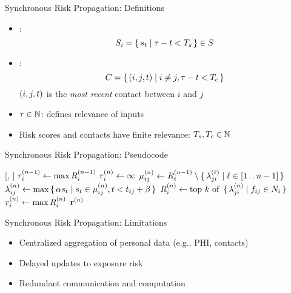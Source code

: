 \documentclass[11pt]{beamer}
\begin{document}
\begin{frame}{Synchronous Risk Propagation: Definitions}
\begin{itemize}
  \item {}:
    \begin{equation*}
      S_i =\set{ s_t | \tau- t< T_s} \in S
    \end{equation*}
    \item {}:
      \begin{equation*}
        C = \set{ (i, j, t) | i \neq j, \tau- t< T_c}
      \end{equation*}
      $(i, j, t)$ is the \emph{most recent} contact between $i$ and $j$
      \item {} $\tau \in \mathbb{N}$: defines relevance of inputs
      \item Risk scores and contacts have finite relevance: $T_s, T_c \in \mathbb{N}$
\end{itemize}
\end{frame}

\begin{frame}{Synchronous Risk Propagation: Pseudocode}
\begin{function}{\nRiskPropagation}[\vScores, \vContacts]
  \State $r_{i}^{(n - 1)} \leftarrow \max R_{i}^{(n - 1)}$
  \State $r_{i}^{(n)} \leftarrow \infty$
    \State $\mu_{ij}^{(n)} \leftarrow R_{i}^{(n - 1)} \setminus \set{ \lambda_{ji}^{(\ell)} | \ell \in [1 \mathinner{\ldotp \ldotp} n - 1]}$
    \State $\lambda_{ij}^{(n)} \leftarrow \max \set{ \alpha s_t| s_t\in \mu_{ij}^{(n)}, t< t_{ij} + \beta}$
    \State $\vRiskScores{i}{n} \assign \topK{\setBuilder{\vFactorMessage{j}{i}{n}}{\vFactor[ij] \in \vNeighbors_i}}$
    \State $r_{i}^{(n)} \leftarrow \max R_{i}^{(n)}$
  \EndWhile
  \State \Return $\mathbf{r}^{(n)}$
\end{function}
\end{frame}

\begin{frame}{Synchronous Risk Propagation: Limitations}
\begin{itemize}
  \item Centralized aggregation of personal data (e.g., PHI, contacts)
  \item Delayed updates to exposure risk
  \item Redundant communication and computation
\end{itemize}
\end{frame}
\end{document}
